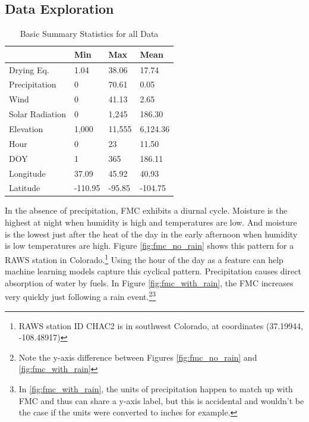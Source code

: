 \documentclass[11pt]{article}%
\begin{document}
\subsection{Data Exploration}

\begin{table}[ht]
\centering
\caption{Basic Summary Statistics for all Data}
\label{tab:all_dat_summary}
\begin{tabular}{llll}
\toprule
 & Min & Max & Mean \\
\midrule
Drying Eq. & 1.04 & 38.06 & 17.74 \\
Precipitation & 0 & 70.61 & 0.05 \\
Wind & 0 & 41.13 & 2.65 \\
Solar Radiation & 0 & 1,245 & 186.30 \\
Elevation & 1,000 & 11,555 & 6,124.36 \\
Hour & 0 & 23 & 11.50 \\
DOY & 1 & 365 & 186.11 \\
Longitude & 37.09 & 45.92 & 40.93 \\
Latitude & -110.95 & -95.85 & -104.75 \\
\bottomrule
\end{tabular}
\end{table}

In the absence of precipitation, FMC exhibits a diurnal cycle. Moisture is the highest at night when humidity is high and temperatures are low. And moisture is the lowest just after the heat of the day in the early afternoon when humidity is low temperatures are high. Figure \ref{fig:fmc_no_rain} shows this pattern for a RAWS station in Colorado.\footnote{RAWS station ID CHAC2 is in southwest Colorado, at coordinates (37.19944,	-108.48917)} Using the hour of the day as a feature can help machine learning models capture this cyclical pattern. Precipitation causes direct absorption of water by fuels. In Figure \ref{fig:fmc_with_rain}, the FMC increases very quickly just following a rain event.\footnote{Note the y-axis difference between Figures \ref{fig:fmc_no_rain} and \ref{fig:fmc_with_rain}}\footnote{In \ref{fig:fmc_with_rain}, the units of precipitation happen to match up with FMC and thus can share a y-axis label, but this is accidental and wouldn't be the case if the units were converted to inches for example.}
\end{document}
